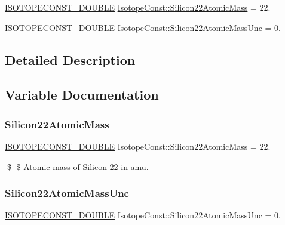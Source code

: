 \begin{DoxyCompactItemize}
\item 
\mbox{\hyperlink{group___isotope_const-_macros_ga8f45a7272ce02c0b4c65c44636ed719a}{I\+S\+O\+T\+O\+P\+E\+C\+O\+N\+S\+T\+\_\+\+D\+O\+U\+B\+LE}} \mbox{\hyperlink{group___isotope_const-_silicon-_si22_ga677493a06e940f00291107d4279cd778}{Isotope\+Const\+::\+Silicon22\+Atomic\+Mass}} = 22.
\item 
\mbox{\hyperlink{group___isotope_const-_macros_ga8f45a7272ce02c0b4c65c44636ed719a}{I\+S\+O\+T\+O\+P\+E\+C\+O\+N\+S\+T\+\_\+\+D\+O\+U\+B\+LE}} \mbox{\hyperlink{group___isotope_const-_silicon-_si22_gad6cc6fa9807b264faaa4a4138ca1fb99}{Isotope\+Const\+::\+Silicon22\+Atomic\+Mass\+Unc}} = 0.
\end{DoxyCompactItemize}


\subsection{Detailed Description}


\subsection{Variable Documentation}
\mbox{\label{group___isotope_const-_silicon-_si22_ga677493a06e940f00291107d4279cd778}} 
\subsubsection{\texorpdfstring{Silicon22\+Atomic\+Mass}{Silicon22AtomicMass}}
{\footnotesize\ttfamily \mbox{\hyperlink{group___isotope_const-_macros_ga8f45a7272ce02c0b4c65c44636ed719a}{I\+S\+O\+T\+O\+P\+E\+C\+O\+N\+S\+T\+\_\+\+D\+O\+U\+B\+LE}} Isotope\+Const\+::\+Silicon22\+Atomic\+Mass = 22.}

\$ \$ Atomic mass of Silicon-\/22 in amu. \mbox{\label{group___isotope_const-_silicon-_si22_gad6cc6fa9807b264faaa4a4138ca1fb99}} 
\subsubsection{\texorpdfstring{Silicon22\+Atomic\+Mass\+Unc}{Silicon22AtomicMassUnc}}
{\footnotesize\ttfamily \mbox{\hyperlink{group___isotope_const-_macros_ga8f45a7272ce02c0b4c65c44636ed719a}{I\+S\+O\+T\+O\+P\+E\+C\+O\+N\+S\+T\+\_\+\+D\+O\+U\+B\+LE}} Isotope\+Const\+::\+Silicon22\+Atomic\+Mass\+Unc = 0.}

